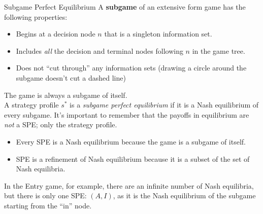 \documentclass[8pt]{extarticle}
\begin{document}
  \begin{problem}{Subgame Perfect Equilibrium}
    A \textbf{subgame} of an extensive form game has the following properties:
    \begin{itemize}
      \item Begins at a decision node $n$ that is a singleton information set.
      \item Includes \textit{all} the decision and terminal nodes following $n$ in the game tree.
      \item Does not ``cut through'' any information sets (drawing a circle around the subgame doesn't cut a dashed line)
    \end{itemize}
    The game is always a subgame of itself.\\

    A strategy profile $s^*$ is a \textit{subgame perfect equilibrium} if it is a Nash equilibrium of every subgame. It's important to remember that the payoffs in equilibrium are \textit{not} a SPE; only the strategy profile.
    \begin{itemize}
      \item Every SPE is a Nash equilibrium because the game is a subgame of itself.
      \item SPE is a refinement of Nash equilibrium because it is a subset of the set of Nash equilibria.
    \end{itemize}
    \begin{center}
    \end{center}
    In the Entry game, for example, there are an infinite number of Nash equilibria, but there is only one SPE: $(A,I)$, as it is the Nash equilibrium of the subgame starting from the ``in'' node.\\


\end{problem}
\end{document}
